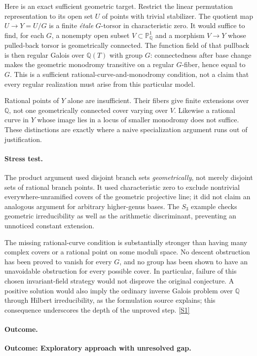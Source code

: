 \documentclass[11pt,a4paper]{article}
\newcommand{\Q}{\mathbb{Q}}
\newcommand{\PP}{\mathbb P}
\newcommand{\sref}[2]{\hyperlink{source:#1:#2}{[S#2]}}
\numberwithin{equation}{section}
\begin{document}
Here is an exact sufficient geometric target.  Restrict the linear
permutation representation to its open set $U$ of points with trivial
stabilizer.  The quotient map $U\to Y=U/G$ is a finite \emph{\'{e}tale}
$G$-torsor in characteristic zero.  It would suffice to find, for each
$G$, a nonempty open subset $V\subset\PP^1_{\Q}$ and a morphism
$V\to Y$ whose pulled-back torsor is geometrically connected.  The
function field of that pullback is then regular Galois over $\Q(T)$
with group $G$: connectedness after base change makes the geometric
monodromy transitive on a regular $G$-fiber, hence equal to $G$.
This is a sufficient rational-curve-and-monodromy condition, not a claim
that every regular realization must arise from this particular model.

Rational points of $Y$ alone are insufficient.  Their fibers give
finite extensions over $\Q$, not one geometrically connected cover
varying over $V$.  Likewise a rational curve in $Y$ whose image lies in
a locus of smaller monodromy does not suffice.  These distinctions are
exactly where a naive specialization argument runs out of justification.

\paragraph{Stress test.}
The product argument used disjoint branch sets \emph{geometrically},
not merely disjoint sets of rational branch points.  It used
characteristic zero to exclude nontrivial everywhere-unramified covers
of the geometric projective line; it did not claim an analogous argument
for arbitrary higher-genus bases.  The $S_3$ example checks geometric
irreducibility as well as the arithmetic discriminant, preventing an
unnoticed constant extension.

The missing rational-curve condition is substantially stronger than
having many complex covers or a rational point on some moduli space.
No descent obstruction has been proved to vanish for every $G$, and no
group has been shown to have an unavoidable obstruction for every possible
cover.  In particular, failure of this chosen invariant-field strategy
would not disprove the original conjecture.  A positive solution would
also imply the ordinary inverse Galois problem over $\Q$ through Hilbert
irreducibility, as the formulation source explains; this consequence
underscores the depth of the unproved step. \sref{statement}{1}

\paragraph{Outcome.}
\textbf{Outcome: Exploratory approach with unresolved gap.}
\end{document}

